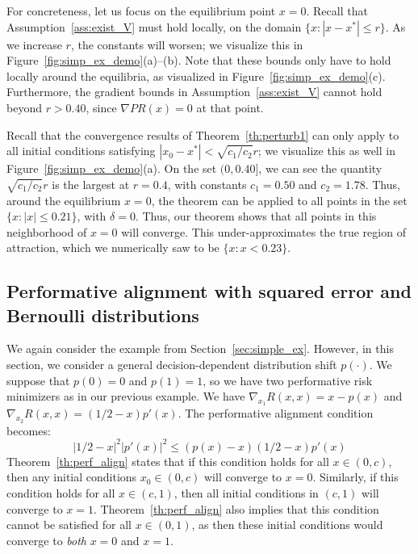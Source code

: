 For concreteness, let us focus on the equilibrium point $x = 0$. Recall that Assumption~\ref{ass:exist_V} must hold locally, on the domain $\{ x : |x-x^*| \le r\}$. As we increase $r$, the constants will worsen; we visualize this in Figure~\ref{fig:simp_ex_demo}(a)--(b). Note that these bounds only have to hold locally around the equilibria, as visualized in Figure~\ref{fig:simp_ex_demo}(c). Furthermore, the gradient bounds in Assumption~\ref{ass:exist_V} cannot hold beyond $r > 0.40$, since $\nabla PR(x) = 0$ at that point.

Recall that the convergence results of Theorem~\ref{th:perturb1} can only apply to all initial conditions satisfying $|x_0 - x^*| < \sqrt{c_1/c_2}r$; we visualize this as well in Figure~\ref{fig:simp_ex_demo}(a). 
On the set $(0,0.40]$, we can see the quantity $\sqrt{c_1/c_2}r$ is the largest at $r = 0.4$, with constants $c_1 = 0.50$ and $c_2 = 1.78$. 
Thus, around the equilibrium $x = 0$, the theorem can be applied to all points in the set $\{ x : |x| \le 0.21 \}$, with $\delta = 0$. Thus, our theorem shows that all points in this neighborhood of $x = 0$ will converge. This under-approximates the true region of attraction, which we numerically saw to be $\{ x : x < 0.23 \}$.



\subsection{Performative alignment with squared error and Bernoulli distributions}
\label{sec:perf_align_ex}

We again consider the example from Section~\ref{sec:simple_ex}. However, in this section, we consider a general decision-dependent distribution shift $p(\cdot)$. 
We suppose that $p(0) = 0$ and $p(1) = 1$, so we have two performative risk minimizers as in our previous example. We have $\nabla_{x_1}R(x,x) = x - p(x)$ and $\nabla_{x_2}R(x,x) = (1/2 - x) p'(x)$. 
The performative alignment condition becomes:
\begin{equation}
    \label{eq:perf_align_ex}
    |1/2 - x|^2 |p'(x)|^2 \le (p(x)-x)(1/2 - x)p'(x)
\end{equation}
Theorem~\ref{th:perf_align} states that if this condition holds for all $x \in (0,c)$, then any initial conditions $x_0 \in (0,c)$ will converge to $x = 0$. Similarly, if this condition holds for all $x \in (c,1)$, then all initial conditions in $(c,1)$ will converge to $x = 1$. Theorem~\ref{th:perf_align} also implies that this condition cannot be satisfied for all $x \in (0,1)$, as then these initial conditions would converge to \textit{both} $x = 0$ and $x = 1$.

